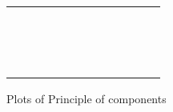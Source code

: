 \documentclass[a4paper,oneside]{report}
\begin{document}
 \begin{figure}[htbp]
 \pagestyle{myheadings} 
 \begin{tabular}[c]{cc}
 \begin{subfigure}[l]{0.45\textwidth}
  
 \end{subfigure}&
 \begin{subfigure}[l]{0.45\textwidth}
 
 \null\hfill
 \end{subfigure}\\
 
 
 \begin{subfigure}[c]{0.5\textwidth}
 
 \null\hfill
 \end{subfigure}&
 
\begin{subfigure}[c]{0.4\textwidth}
\begin{adjustbox}{max width=\textwidth}

\end{adjustbox}
\end{subfigure}\\
 
 

\begin{subfigure}[c]{0.5\textwidth}
 
 \end{subfigure}&
 
\begin{subfigure}[c]{0.5\textwidth}
\begin{adjustbox}{max width=\textwidth}

\end{adjustbox}
 \end{subfigure}\\
 
 
\begin{subfigure}[c]{0.5\textwidth}
 
 \end{subfigure}&
 
 \begin{subfigure}[c]{0.5\textwidth}
 \begin{adjustbox}{max width=\textwidth}

\end{adjustbox}
 \end{subfigure}\\
 
 
 
\end{tabular}
 \caption{Plots of Principle of components}\label{fig:bubble plots}
 \end{figure}
 
\end{document}
